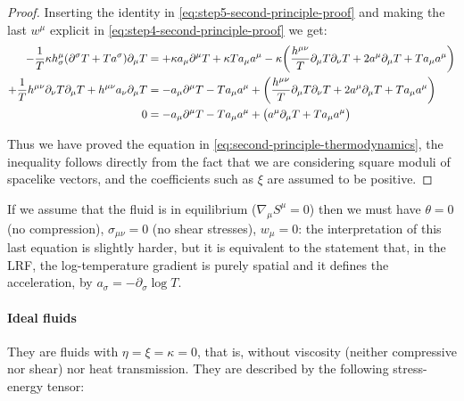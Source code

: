 \documentclass[main.tex]{subfiles}
\begin{document}
\begin{proof}
    Inserting the identity in \eqref{eq:step5-second-principle-proof}  and making the last \(w^\mu\) explicit in \eqref{eq:step4-second-principle-proof} we get:
    \begin{subequations}
    \begin{align}
      -\frac{1}{T} \kappa h^\mu _\sigma  \qty(\partial^\sigma T + T a^\sigma) \partial_\mu T  &= + \kappa a_\mu \partial^\mu T + \kappa T a_\mu a^\mu
      -\kappa \qty(\frac{h^{\mu\nu}}{T} \partial_\mu T \partial_\nu T + 2 a^\mu \partial_\mu T + T a_\mu a^\mu) \\
      +\frac{1}{T} h^{\mu\nu} \partial_\nu T  \partial_\mu T + h^{\mu\nu} a_\nu \partial_\mu T  &= - a_\mu \partial^\mu T -  T a_\mu a^\mu
      + \qty(\frac{h^{\mu\nu}}{T} \partial_\mu T \partial_\nu T + 2 a^\mu \partial_\mu T + T a_\mu a^\mu) \\
      0  &= - a_\mu \partial^\mu T -  T a_\mu a^\mu
      + \qty( a^\mu \partial_\mu T + T a_\mu a^\mu)
    \end{align}
    \end{subequations}

    Thus we have proved the equation in \eqref{eq:second-principle-thermodynamics}, the inequality follows directly from the fact that we are considering square moduli of spacelike vectors, and the coefficients such as \(\xi\) are assumed to be positive.
\end{proof}

If we assume that the fluid is in equilibrium (\(\nabla_\mu S^\mu = 0\)) then we must have \(\theta = 0\) (no compression), \(\sigma_{\mu\nu} = 0 \) (no shear stresses), \(w_\mu=0\): the interpretation of this last equation is slightly harder, but it is equivalent to the statement that, in the LRF, the log-temperature gradient is purely spatial and it defines the acceleration, by \(a_\sigma = - \partial_\sigma \log T\).

%


\paragraph{Ideal fluids}

They are fluids with \(\eta=\xi=\kappa=0\), that is, without viscosity (neither compressive nor shear) nor heat transmission.
They are described by the following stress-energy tensor:
\end{document}
